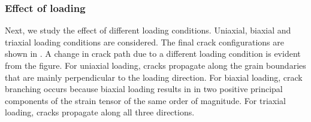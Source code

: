 \subsubsection{Effect of loading}

Next, we study the effect of different loading conditions. Uniaxial, biaxial and triaxial loading conditions are considered. The final crack configurations are shown in . A change in crack path due to a different loading condition is evident from the figure. For uniaxial loading, cracks propagate along the grain boundaries that are mainly perpendicular to the loading direction. For biaxial loading, crack branching occurs because biaxial loading results in in two positive principal components of the strain tensor of the same order of magnitude. For triaxial loading, cracks propagate along all three directions.
